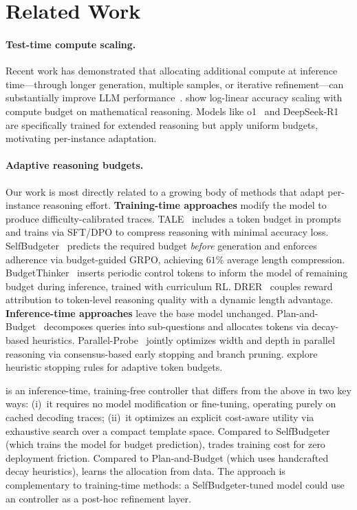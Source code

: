 \section{Related Work}
\label{sec:related}

\paragraph{Test-time compute scaling.}
Recent work has demonstrated that allocating additional compute at inference time---through longer generation, multiple samples, or iterative refinement---can substantially improve LLM performance~\citep{snell2024scaling,openai2024o1,muennighoff2025s1}.
\citet{snell2024scaling} show log-linear accuracy scaling with compute budget on mathematical reasoning.
Models like o1~\citep{openai2024o1} and DeepSeek-R1~\citep{deepseek2025r1} are specifically trained for extended reasoning but apply uniform budgets, motivating per-instance adaptation.

\paragraph{Adaptive reasoning budgets.}
Our work is most directly related to a growing body of methods that adapt per-instance reasoning effort.
\textbf{Training-time approaches} modify the model to produce difficulty-calibrated traces.
TALE~\citep{han2025tale} includes a token budget in prompts and trains via SFT/DPO to compress reasoning with minimal accuracy loss.
SelfBudgeter~\citep{liu2025selfbudgeter} predicts the required budget \emph{before} generation and enforces adherence via budget-guided GRPO, achieving $61\%$ average length compression.
BudgetThinker~\citep{yang2025budgetthinker} inserts periodic control tokens to inform the model of remaining budget during inference, trained with curriculum RL.
DRER~\citep{zhu2025drer} couples reward attribution to token-level reasoning quality with a dynamic length advantage.
\textbf{Inference-time approaches} leave the base model unchanged.
Plan-and-Budget~\citep{li2025planbudget} decomposes queries into sub-questions and allocates tokens via decay-based heuristics.
Parallel-Probe~\citep{zheng2025parallelprobe} jointly optimizes width and depth in parallel reasoning via consensus-based early stopping and branch pruning.
\citet{aggarwal2023let} explore heuristic stopping rules for adaptive token budgets.

\adathink{} is an inference-time, training-free controller that differs from the above in two key ways:
(i)~it requires no model modification or fine-tuning, operating purely on cached decoding traces;
(ii)~it optimizes an explicit cost-aware utility via exhaustive search over a compact template space.
Compared to SelfBudgeter (which trains the model for budget prediction), \adathink{} trades training cost for zero deployment friction.
Compared to Plan-and-Budget (which uses handcrafted decay heuristics), \adathink{} learns the allocation from data.
The approach is complementary to training-time methods: a SelfBudgeter-tuned model could use an \adathink{} controller as a post-hoc refinement layer.

